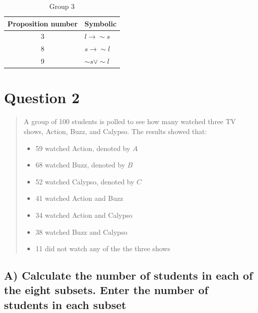 \documentclass[12pt,a4paper]{article}
\begin{document}
\begin{table}[h]
\centering
\caption{Group 3}
\begin{tabular}{c|l}
Proposition number & Symbolic \\
\hline
3 & $l \rightarrow \sim{s}$ \\
\hline
8 & $s \rightarrow \sim{l}$ \\
\hline
9 & $\sim{s} \vee \sim{l}$ \\
\end{tabular}
\end{table}

\newpage
\section{Question 2}
\begin{quote}
A group of 100 students is polled to see how many watched three TV shows, Action, Buzz, and Calypso. The results showed that:
\begin{itemize}
\item 59 watched Action, denoted by $A$
\item 68 watched Buzz, denoted by $B$
\item 52 watched Calypso, denoted by $C$
\item 41 watched Action and Buzz
\item 34 watched Action and Calypso
\item 38 watched Buzz and Calypso
\item 11 did not watch any of the the three shows 
\end{itemize}
\end{quote}

\subsection{A) Calculate the number of students in each of the eight subsets. Enter the number of students in each subset}
\end{document}
